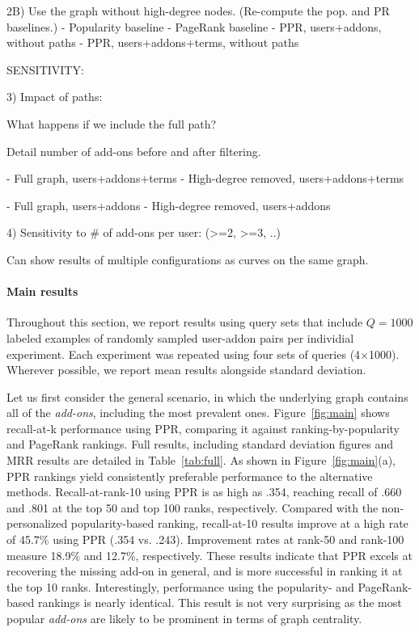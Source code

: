\documentclass[11pt,oneside]{book}
\begin{document}
2B) Use the graph without high-degree nodes. (Re-compute the pop. and PR baselines.)
- Popularity baseline
- PageRank baseline
- PPR, users+addons, without paths
- PPR, users+addons+terms, without paths

SENSITIVITY:

3) Impact of paths:

What happens if we include the full path?

Detail number of add-ons before and after filtering. 

- Full graph, users+addons+terms
- High-degree removed, users+addons+terms

- Full graph, users+addons
- High-degree removed, users+addons

4) Sensitivity to # of add-ons per user: (>=2, >=3, ..)

Can show results of multiple configurations as curves on the same graph.
\fi

\paragraph{Main results}

Throughout this section, we report results using query sets that include $Q=1000$ labeled examples of randomly sampled user-addon pairs per individial experiment. Each experiment was repeated using four sets of queries (4$\times$1000). Wherever possible, we report mean results alongside standard deviation.  

Let us first consider the general scenario, in which the underlying graph contains all of the {\it add-ons}, including the most prevalent ones. Figure~\ref{fig:main} shows recall-at-k performance using PPR, comparing it against ranking-by-popularity and PageRank rankings. Full results, including standard deviation figures and MRR results are detailed in Table~\ref{tab:full}.
As shown in Figure~\ref{fig:main}(a), PPR rankings yield consistently preferable performance to the alternative methods. Recall-at-rank-10 using PPR is as high as .354, reaching recall of .660 and .801 at the top 50 and top 100 ranks, respectively. Compared with the non-personalized popularity-based ranking, recall-at-10 results improve at a high rate of 45.7\% using PPR (.354 vs. .243). Improvement rates at rank-50 and rank-100 measure 18.9\% and 12.7\%, respectively. These results indicate that PPR excels at recovering the missing add-on in general, and is more successful in ranking it at the top 10 ranks.  Interestingly, performance using the popularity- and PageRank-based rankings is nearly identical. This result is not very surprising as the most popular {\it add-ons} are likely to be prominent in terms of graph centrality. 
\end{document}
